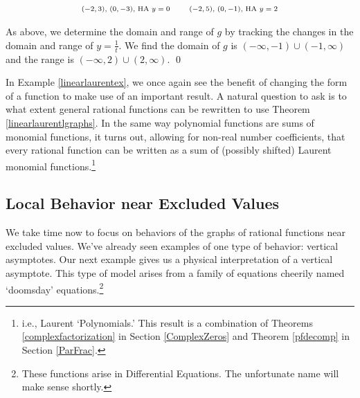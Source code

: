 \begin{ex}
\begin{enumerate}
\begin{figure}
\begin{center}
\[\begin{array}{ccc}
\text{\scriptsize   $(-2,3)$,  $(0,-3)$, HA $y = 0$} & & \text{\scriptsize    $(-2,5)$,  $(0,-1)$, HA $y = 2$} \\
 
\end{array}\]

\caption{}
\label{fig:shiftybytwo}
\end{center}
\end{figure}
 
As above, we determine the domain and range of $g$ by tracking the changes in the domain and range of $y = \frac{1}{t}$.  We find the domain of $g$ is $(-\infty, -1) \cup (-1, \infty)$ and the range is $(-\infty, 2) \cup (2, \infty)$.  \qed

\end{enumerate}

\end{ex}

In Example \ref{linearlaurentex}, we once again see the benefit of changing the form of a function to make use of an important result.  A natural question to ask is to what extent general rational functions can be rewritten to use Theorem \ref{linearlaurentlgraphs}.  In the same way polynomial functions are sums of monomial functions, it turns out, allowing for non-real number coefficients,  that every rational function can be written as a sum of (possibly shifted) Laurent monomial functions.\footnote{i.e.,  Laurent `Polynomials.'  This result is a combination of Theorems \ref{complexfactorization} in  Section \ref{ComplexZeros} and Theorem \ref{pfdecomp} in Section \ref{ParFrac}.}

\subsection{Local Behavior near Excluded Values}
\label{vaorholesection}

We take time now to focus on behaviors of the graphs of rational functions near excluded values.  We've already seen examples of one type of behavior:  vertical asymptotes.  Our next example gives us a physical interpretation of a vertical asymptote.  This type of model arises from a family of equations cheerily named `doomsday' equations.\footnote{These functions arise in Differential Equations.  The unfortunate name will make sense shortly.}  

